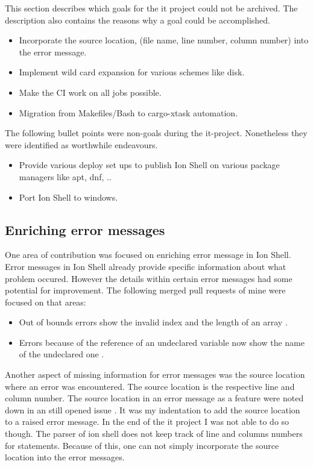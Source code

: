 This section describes which goals for the it project could not be archived.
The description also contains the reasons why a goal could be accomplished.

\begin{itemize}
	\item Incorporate the source location, (file name, line number, column number) into the error message.
	\item Implement wild card expansion for various schemes like disk.
	\item Make the CI work on all jobs possible.
	\item Migration from Makefiles/Bash to cargo-xtask automation.
\end{itemize}

The following bullet points were non-goals during the it-project. Nonetheless they were identified as worthwhile endeavours.

\begin{itemize}
	\item Provide various deploy set ups to publish Ion Shell on various package managers like apt, dnf, ..
	\item Port Ion Shell to windows.
\end{itemize}

\subsection{Enriching error messages}

One area of contribution was focused on enriching error message in Ion Shell.
Error messages in Ion Shell already provide specific information about what problem occured.
However the details within certain error messages had some potential for improvement.
The following merged pull requests of mine were focused on that areas:

\begin{itemize}
	\item Out of bounds errors show the invalid index and the length of an array \cite{pr_error_message_shows_invalid_range}.
	\item Errors because of the reference of an undeclared variable now show the name of the undeclared one \cite{pr_better_not_found_variable_show}.
\end{itemize}

Another aspect of missing information for error messages was the source location where an error was encountered.
The source location is the respective line and column number.
The source location in an error message as a feature were noted down in an still opened issue \cite{issue_enrich_error_message_information} .
It was my indentation to add the source location to a raised error message.
In the end of the it project I was not able to do so though.
The parser of ion shell does not keep track of line and columns numbers for statements.
Because of this, one can not simply incorporate the source location into the error messages.

